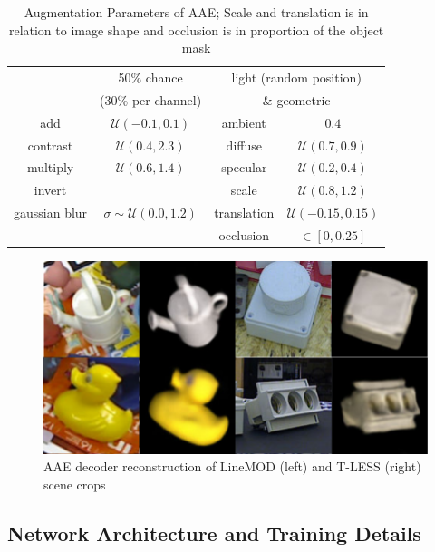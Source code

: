 \begin{table}[t]
	\scriptsize
	\centering
	\captionsetup{width=0.9\columnwidth}
	\caption{Augmentation Parameters of \gls{AAE}; Scale and translation is in relation to image shape and occlusion is in proportion of the object mask}
	\begin{tabular}{cc|cc}
		\toprule
		& 50\% chance &\multicolumn{2}{c}{light (random position) } \\
		& (30\% per channel) & \multicolumn{2}{c}{\& geometric}\\
		\midrule
		add & $\mathcal{U}(-0.1,0.1)$ & ambient &$0.4$ \\
		contrast & $\mathcal{U}(0.4,2.3)$ &diffuse &$\mathcal{U}(0.7,0.9)$\\
		multiply & $\mathcal{U}(0.6,1.4)$ & specular&$\mathcal{U}(0.2,0.4)$ \\
		invert &  & scale &$\mathcal{U}(0.8,1.2)$\\
		gaussian blur & $\sigma \sim \mathcal{U}(0.0,1.2)$ & translation & $\mathcal{U}(-0.15,0.15)$\\
		&& occlusion & $\in [0,0.25]$ 
	\end{tabular}
	\label{tab:aug_strong_col}
\end{table}


\begin{figure}[t]%
	\centering
	
	\centering
	\captionsetup{width=0.95\columnwidth}
	\includegraphics[width=0.82\columnwidth]{reconstruction_imgs.pdf}
	\caption{\gls{AAE} decoder reconstruction of LineMOD (left) and T-LESS (right) scene crops}
	\label{fig:reconst_ex}
	
\end{figure}
\subsection{Network Architecture and Training Details}


